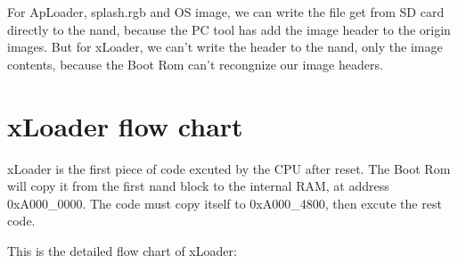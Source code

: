 \documentclass[11pt]{article}
\begin{document}
	For ApLoader, splash.rgb and OS image, we can write the file get from SD card directly to
	the nand, because the PC tool has add the image header to the origin images. But for xLoader,
	we can't write the header to the nand, only the image contents, because the Boot Rom can't
	recongnize our image headers.

\section{xLoader flow chart}
	xLoader is the first piece of code excuted by the CPU after reset. The Boot Rom will copy it
	from the first nand block to the internal RAM, at address 0xA000\_0000. The code must copy
	itself to 0xA000\_4800, then excute the rest code.

	This is the detailed flow chart of xLoader:
\end{document}
